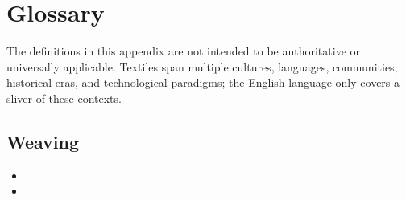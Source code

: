 \chapter{Glossary}

The definitions in this appendix are not intended to be authoritative or universally applicable. Textiles span multiple cultures, languages, communities, historical eras, and technological paradigms; the English language only covers a sliver of these contexts.

\section{Weaving}

\begin{itemize}
\item {}
\item {}

\end{itemize}